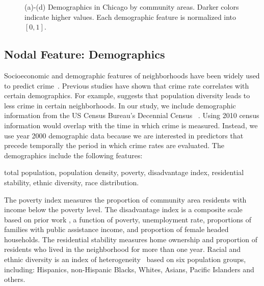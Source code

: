\begin{figure}[t]
\caption{(a)-(d) Demographics in Chicago by community areas. Darker colors indicate higher values. Each demographic feature is normalized into $[0,1]$.}
\label{fig:demo-f}
\end{figure}





\subsection{Nodal Feature: Demographics}

Socioeconomic and demographic features of neighborhoods have been
widely used to predict crime~\cite{Bogo14, HsPu93, WoMe12, SaHi07}. Previous studies have shown that crime rate correlates with certain demographics. For example, \cite{Jac61, GrSa09} suggests that population diversity leads to less crime in certain neighborhoods. 
In our study, we include demographic information from the US Census Bureau's Decennial Census ~\cite{census-data}.   Using 2010 census information would overlap with the time in which crime is measured. Instead, we use year 2000 demographic data because we are interested in predictors that precede temporally the period in which crime rates are evaluated. The demographics include the following features:

\textsf{total population, population density, poverty, disadvantage index, residential stability, ethnic diversity, race distribution}.


The poverty index measures the proportion of community area residents
with income below the poverty level. The disadvantage index is
a composite scale based on prior work \cite{SRE97}, a function of 
poverty, unemployment rate, proportions of families with public
assistance income, and proportion of female headed households. 
 The residential stability measures home ownership and proportion of
residents who lived in the neighborhood for more than one year. Racial
and ethnic diversity is an index of heterogeneity~\cite{GrSa09} based on six
population groups, including: Hispanics, non-Hispanic Blacks, Whites,
Asians, Pacific Islanders and others.


